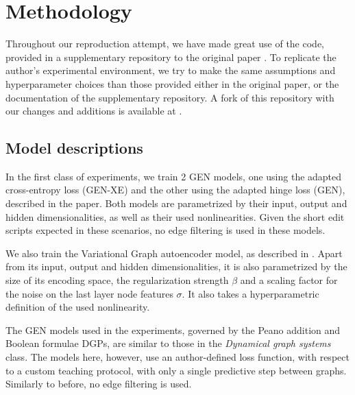 \section{Methodology}

Throughout our reproduction attempt, we have made great use of the code, provided in a supplementary repository to the original paper \cite{gitlab}. To replicate the author's experimental environment, we try to make the same assumptions and hyperparameter choices than those provided either in the original paper, or the documentation of the supplementary repository. A fork of this repository with our changes and additions is available at \cite{Git}.


\subsection{Model descriptions}
\label{subsec:models}
In the first class of experiments, we train 2 GEN models, one using the adapted cross-entropy loss (GEN-XE) and the other using the adapted hinge loss (GEN), described in the paper. Both models are parametrized by their input, output and hidden dimensionalities, as well as their used nonlinearities. Given the short edit scripts expected in these scenarios, no edge filtering is used in these models.

We also train the Variational Graph autoencoder model, as described in \cite{vgae}. Apart from its input, output and hidden dimensionalities, it is also parametrized by the size of its encoding space, the regularization strength $\beta$ and a scaling factor for the noise on the last layer node features $\sigma$. It also takes a hyperparametric definition of the used nonlinearity. 

The GEN models used in the experiments, governed by the Peano addition and Boolean formulae DGPs, are similar to those in the \textit{Dynamical graph systems} class. The models here, however, use an author-defined loss function, with respect to a custom teaching protocol, with only a single predictive step between graphs. Similarly to before, no edge filtering is used.


